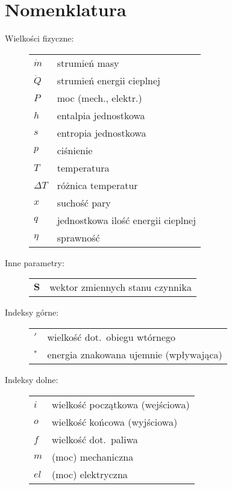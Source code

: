 \section{Nomenklatura}

\begin{description}

	\item[Wielkości fizyczne:] \hfill

\begin{tabular}{p{1.2cm}l}
	$\dot m$ & strumień masy \\
	$\dot Q$ & strumień energii cieplnej \\
	$P$ & moc (mech., elektr.) \\
	$h$ & entalpia jednostkowa \\
	$s$ & entropia jednostkowa \\
	$p$ & ciśnienie \\
	$T$ & temperatura \\
	$\Delta T$ & różnica temperatur \\
	$x$ & suchość pary \\
	$q$ & jednostkowa ilość energii cieplnej \\
	$\eta$ & sprawność \\
\end{tabular}

	\item[Inne parametry:] \hfill

\begin{tabular}{p{1.2cm}l}
	$\mathbf{S}$ & wektor zmiennych stanu czynnika \\
\end{tabular}

	\item[Indeksy górne:] \hfill

\begin{tabular}{p{1.2cm}l}
	$'$ & wielkość dot.~obiegu wtórnego \\
	$^*$ & energia znakowana ujemnie (wpływająca) \\
\end{tabular}

	\item[Indeksy dolne:] \hfill

\begin{tabular}{p{1.2cm}l}
	$i$ & wielkość początkowa (wejściowa) \\
	$o$ & wielkość końcowa (wyjściowa) \\
	$f$ & wielkość dot.~paliwa \\
	$m$ & (moc) mechaniczna \\
	$el$ & (moc) elektryczna \\
\end{tabular}

\end{description}

